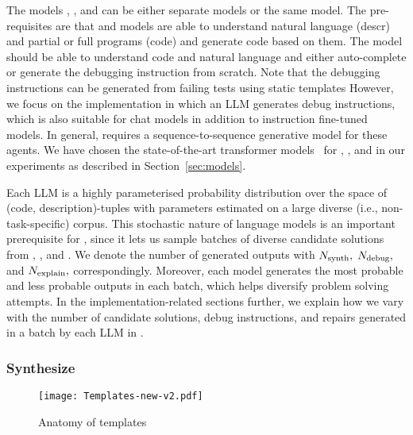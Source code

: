 The models \synthmodel{}, \debugmodel{}, and \textmodel{} can be either separate models or the same model.
The pre-requisites are that \synthmodel{} and \debugmodel{} models are able to understand natural language (descr) and partial or full programs (code) and generate code based on them. 
The model \textmodel{} should be able to understand code and natural language and either auto-complete or generate the debugging instruction from scratch. 
Note that the debugging instructions can be generated from failing tests using static templates 
However, we focus on the implementation in which an LLM generates debug instructions, which is also suitable for chat models in addition to instruction fine-tuned models. 
In general, \method{} requires a sequence-to-sequence generative model for these agents. 
We have chosen the state-of-the-art transformer models~\cite{vaswani2017:attention} for \synthmodel{}, \debugmodel{}, and \textmodel{} in our experiments as described in Section~\ref{sec:models}. 

Each LLM is a highly parameterised probability distribution over the space of (code, description)-tuples with parameters estimated on a large diverse (i.e., non-task-specific) corpus.
This stochastic nature of language models is an important prerequisite for \method{}, since it lets us sample batches of diverse candidate solutions from \synthmodel{}, \debugmodel{}, and \textmodel{}. 
We denote the number of generated outputs with $N_\text{synth}{},$ $N_\text{debug}{},$ and $N_\text{explain}{},$ correspondingly.
Moreover, each model generates the most probable and less probable outputs in each batch, which helps diversify problem solving attempts. 
In the implementation-related sections further, we explain how we vary with the number of candidate solutions, debug instructions, and repairs generated in a batch by each LLM in \method{}.


\subsubsection{Synthesize}
\label{sec:synth}

\begin{figure}
    \centering
    \texttt{[image: Templates-new-v2.pdf]}
    \caption{Anatomy of \synthesize{} templates}
    \label{fig:template}
\end{figure}

